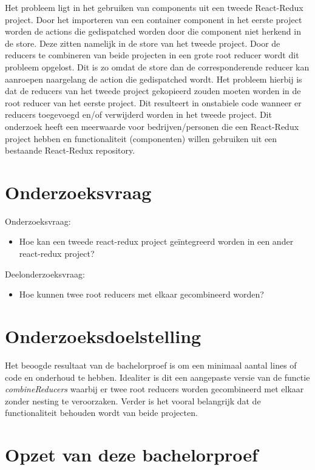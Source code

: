 Het probleem ligt in het gebruiken van components uit een tweede React-Redux project. Door het importeren van een container component in het eerste project worden de actions die gedispatched worden door die component niet herkend in de store. Deze zitten namelijk in de store van het tweede project. Door de reducers te combineren van beide projecten in een grote root reducer wordt dit probleem opgelost. Dit is zo omdat de store dan de corresponderende reducer kan aanroepen naargelang de action die gedispatched wordt. Het probleem hierbij is dat de reducers van het tweede project gekopieerd zouden moeten worden in de root reducer van het eerste project. Dit resulteert in onstabiele code wanneer er reducers toegevoegd en/of verwijderd worden in het tweede project. Dit onderzoek heeft een meerwaarde voor bedrijven/personen die een React-Redux project hebben en functionaliteit (componenten) willen gebruiken uit een bestaande React-Redux repository. 


\section{Onderzoeksvraag}
\label{sec:onderzoeksvraag}

Onderzoeksvraag:
\begin{itemize}
	\item Hoe kan een tweede react-redux project geïntegreerd worden in een ander react-redux project?

\end{itemize}

Deelonderzoeksvraag:
\begin{itemize}
	\item Hoe kunnen twee root reducers met elkaar gecombineerd worden?
\end{itemize}

\section{Onderzoeksdoelstelling}
\label{sec:onderzoeksdoelstelling}
Het beoogde resultaat van de bachelorproef is om een minimaal aantal lines of code en onderhoud te hebben. Idealiter is dit een aangepaste versie van de functie \textit{combineReducers} waarbij er twee root reducers worden gecombineerd met elkaar zonder nesting te veroorzaken. Verder is het vooral belangrijk dat de functionaliteit behouden wordt van beide projecten.

\section{Opzet van deze bachelorproef}
\label{sec:opzet-bachelorproef}

